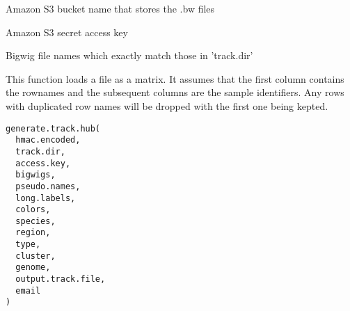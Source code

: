 \documentclass[a4paper]{book}
\begin{document}
%
\begin{Arguments}
\begin{ldescription}
\item[\code{track.dir}] Amazon S3 bucket name that stores the .bw files

\item[\code{secret.key}] Amazon S3 secret access key

\item[\code{bigwigs}] Bigwig file names which exactly match those in 'track.dir'
\end{ldescription}
\end{Arguments}
%
\begin{Description}\relax
This function loads a file as a matrix. It assumes that the first column
contains the rownames and the subsequent columns are the sample identifiers.
Any rows with duplicated row names will be dropped with the first one being
kepted.
\end{Description}
%
\begin{Usage}
\begin{verbatim}
generate.track.hub(
  hmac.encoded,
  track.dir,
  access.key,
  bigwigs,
  pseudo.names,
  long.labels,
  colors,
  species,
  region,
  type,
  cluster,
  genome,
  output.track.file,
  email
)
\end{verbatim}
\end{Usage}
%
\end{document}
